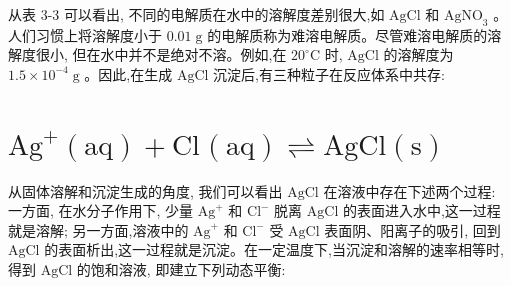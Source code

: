 \documentclass[10pt]{article}
\begin{document}
\begin{center}
\end{center}

从表 3-3 可以看出, 不同的电解质在水中的溶解度差别很大,如 \(\mathrm{{AgCl}}\) 和 \({\mathrm{{AgNO}}}_{3}\) 。人们习惯上将溶解度小于 \({0.01}\mathrm{\;g}\) 的电解质称为难溶电解质。尽管难溶电解质的溶解度很小, 但在水中并不是绝对不溶。例如,在 \({20}^{ \circ }\mathrm{C}\) 时, \(\mathrm{{AgCl}}\) 的溶解度为 \({1.5} \times {10}^{-4}\mathrm{\;g}\) 。因此,在生成 \(\mathrm{{AgCl}}\) 沉淀后,有三种粒子在反应体系中共存:

\section*{\({\mathrm{{Ag}}}^{ + }\left( \mathrm{{aq}}\right) + {\mathrm{{Cl}}}^{ }\left( \mathrm{{aq}}\right) \rightleftharpoons \mathrm{{AgCl}}\left( \mathrm{s}\right)\)}

从固体溶解和沉淀生成的角度, 我们可以看出 \(\mathrm{{AgCl}}\) 在溶液中存在下述两个过程: 一方面, 在水分子作用下, 少量 \({\mathrm{{Ag}}}^{ + }\) 和 \({\mathrm{{Cl}}}^{ - }\) 脱离 \(\mathrm{{AgCl}}\) 的表面进入水中,这一过程就是溶解; 另一方面,溶液中的 \({\mathrm{{Ag}}}^{ + }\) 和 \({\mathrm{{Cl}}}^{ - }\) 受 \(\mathrm{{AgCl}}\) 表面阴、阳离子的吸引, 回到 \(\mathrm{{AgCl}}\) 的表面析出,这一过程就是沉淀。在一定温度下,当沉淀和溶解的速率相等时,得到 \(\mathrm{{AgCl}}\) 的饱和溶液, 即建立下列动态平衡:
\end{document}
